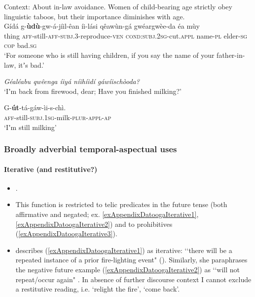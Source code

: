 \largerpage
\begin{exe}
	\ex\label{exAppendixDatooga1}
	Context: About in-law avoidance. Women of child-bearing age strictly obey linguistic taboos, but their importance diminishes with age.\\
	\gll Gídá g-\textbf{ùdù}-gw-á-jíil-êan íi-lási qêawùn-gá gwéargwèe-da éa mùy\\
thing \textsc{aff}-still-\textsc{aff}-\textsc{subj}.3-reproduce-\textsc{ven} \textsc{cond}:\textsc{subj}.2\textsc{sg}-cut.\textsc{appl} name-\textsc{pl} elder-\textsc{sg} \textsc{cop} bad.\textsc{sg}\\
	\glt \lq For someone who is still having children, if you say the name of your father-in-law, itʼs bad.' \parencite[132]{Mitchell2015}
	
	\ex
	\begin{xlist}
				 \textit{Géaléabu qwêenga íiyá níihíidí gáwíischòoda?}\\
		\lq Iʼm back from firewood, dear; Have you finished milking?'

		 \gll G-\textbf{út}-tá-gáw-ìi-s-chì.\\
		\textsc{aff}-still-\textsc{subj}.1\textsc{sg}-milk-\textsc{plur}-\textsc{appl}-\textsc{ap}\\ 
		\glt \lq Iʼm still milking' \parencite[436]{Mitchell2021}
\end{xlist}
\end{exe}

\subsubsection{Broadly adverbial temporal-aspectual uses}
\paragraph{Iterative (and restitutive?)}\label{appendixDatoogaIterative}
\begin{itemize}
	\item \textcite{Mitchell2021}.
	\item This function is restricted to telic predicates in the future tense (both affirmative and negated; ex. \ref{exAppendixDatoogaIterative1}, \ref{exAppendixDatoogaIterative2})  and to prohibitives (\ref{exAppendixDatoogaIterative3}).
	\item \citeauthor{Mitchell2021} describes (\ref{exAppendixDatoogaIterative1}) as iterative: \lq\lq  there will be a repeated instance of a prior fire-lighting event" (\citeyear[429]{Mitchell2021}). Similarly, she paraphrases the negative future example (\ref{exAppendixDatoogaIterative2}) as \lq\lq will not repeat/occur again" \parencite[429]{Mitchell2021}. In absence of further discourse context I cannot exclude a restitutive reading, i.e. \lq relight the fire', \lq come back'.
\end{itemize}

